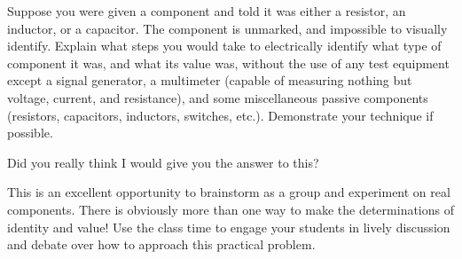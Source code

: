 

Suppose you were given a component and told it was either a resistor, an inductor, or a capacitor.  The component is unmarked, and impossible to visually identify.  Explain what steps you would take to electrically identify what type of component it was, and what its value was, without the use of any test equipment except a signal generator, a multimeter (capable of measuring nothing but voltage, current, and resistance), and some miscellaneous passive components (resistors, capacitors, inductors, switches, etc.).  Demonstrate your technique if possible.







Did you really think I would give you the answer to this?







This is an excellent opportunity to brainstorm as a group and experiment on real components.  There is obviously more than one way to make the determinations of identity and value!  Use the class time to engage your students in lively discussion and debate over how to approach this practical problem.




